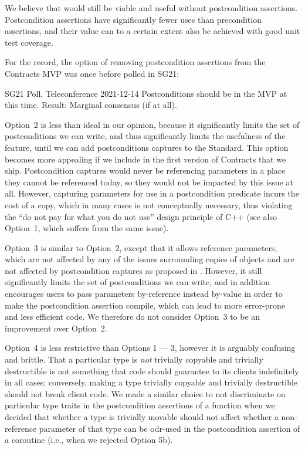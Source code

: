 We believe that \cite{P2900R10} would still be viable and useful without postcondition assertions. Postcondition assertions have significantly fewer uses than precondition assertions, and their value can to a certain extent also be achieved with good unit test coverage. 

For the record, the option of removing postcondition assertions from the Contracts MVP was once before polled in SG21:

\begin{wgpoll}{SG21 Poll, Teleconference 2021-12-14}
Postconditions should be in the MVP at this time.
Result: Marginal consensus (if at all).
\end{wgpoll}

Option~2 is less than ideal in our opinion, because it significantly limits the set of postconditions we can write, and thus significantly limits the usefulness of the feature, until we can add postconditions captures \cite{P3098R0} to the Standard. This option becomes more appealing if we include \cite{P3098R0} in the first version of Contracts that we ship. Postcondition captures would never be referencing parameters in a place they cannot be referenced today, so they would not be impacted by this issue at all. However, capturing parameters for use in a postcondition predicate incurs the cost of a copy, which in many cases is not conceptually necessary, thus violating the ``do not pay for what you do not use'' design principle of C++ (see also \cite{D3484R0} Option~1, which suffers from the same issue).

Option~3 is similar to Option~2, except that it allows reference parameters, which are not affected by any of the issues surrounding copies of objects and are not affected by postcondition captures as proposed in \cite{P3098R0}. However, it still significantly limits the set of postconditions we can write, and in addition encourages users to pass parameters by-reference instead by-value in order to make the postcondition assertion compile, which can lead to more error-prone and less efficient code. We therefore do not consider Option~3 to be an improvement over Option~2.

Option~4 is less restrictive than Options 1 --- 3, however it is arguably confusing and brittle. That a particular type is \emph{not} trivially copyable and trivially destructible is not something that code should guarantee to its clients indefinitely in all cases; conversely, making a type trivially copyable and trivially destructible should not break client code. We made a similar choice to not discriminate on particular type traits in the postcondition assertions of a function when we decided that whether a type is trivially movable should not affect whether a non-reference parameter of that type can be odr-used in the postcondition assertion of a coroutine (i.e., when we rejected \cite{P3387R0} Option 5b).

